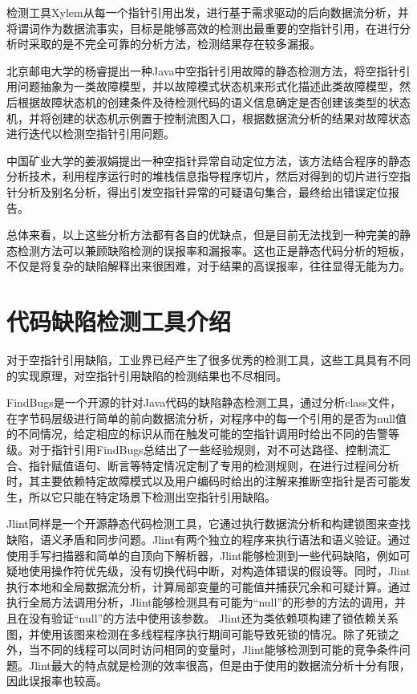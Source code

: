 检测工具Xylem\cite{nanda2009accurate}从每一个指针引用出发，进行基于需求驱动的后向数据流分析，并将谓词作为数据流事实，目标是能够高效的检测出最重要的空指针引用，在进行分析时采取的是不完全可靠的分析方法，检测结果存在较多漏报。

北京邮电大学的杨睿\cite{yangrui2012}提出一种Java中空指针引用故障的静态检测方法，将空指针引用问题抽象为一类故障模型，并以故障模式状态机来形式化描述此类故障模型，然后根据故障状态机的创建条件及待检测代码的语义信息确定是否创建该类型的状态机，并将创建的状态机示例置于控制流图入口，根据数据流分析的结果对故障状态进行迭代以检测空指针引用问题。

中国矿业大学的姜淑娟\cite{jiang2017}提出一种空指针异常自动定位方法，该方法结合程序的静态分析技术，利用程序运行时的堆栈信息指导程序切片，然后对得到的切片进行空指针分析及别名分析，得出引发空指针异常的可疑语句集合，最终给出错误定位报告。

总体来看，以上这些分析方法都有各自的优缺点，但是目前无法找到一种完美的静态检测方法可以兼顾缺陷检测的误报率和漏报率。这也正是静态代码分析的短板，不仅是将复杂的缺陷解释出来很困难，对于结果的高误报率，往往显得无能为力。

\section{代码缺陷检测工具介绍}
对于空指针引用缺陷，工业界已经产生了很多优秀的检测工具，这些工具具有不同的实现原理，对空指针引用缺陷的检测结果也不尽相同。

FindBugs是一个开源的针对Java代码的缺陷静态检测工具，通过分析class文件，在字节码层级进行简单的前向数据流分析，对程序中的每一个引用的是否为null值的不同情况，给定相应的标识从而在触发可能的空指针调用时给出不同的告警等级。对于指针引用FindBugs总结出了一些经验规则，对不可达路径、控制流汇合、指针赋值语句、断言等特定情况定制了专用的检测规则，在进行过程间分析时，其主要依赖特定故障模式以及用户编码时给出的注解来推断空指针是否可能发生，所以它只能在特定场景下检测出空指针引用缺陷。

Jlint同样是一个开源静态代码检测工具，它通过执行数据流分析和构建锁图来查找缺陷，语义矛盾和同步问题。Jlint有两个独立的程序来执行语法和语义验证。通过使用手写扫描器和简单的自顶向下解析器，Jlint能够检测到一些代码缺陷，例如可疑地使用操作符优先级，没有切换代码中断，对构造体错误的假设等。同时，Jlint执行本地和全局数据流分析，计算局部变量的可能值并捕获冗余和可疑计算。通过执行全局方法调用分析，Jlint能够检测具有可能为“null”的形参的方法的调用，并且在没有验证“null”的方法中使用该参数。 Jlint还为类依赖项构建了锁依赖关系图，并使用该图来检测在多线程程序执行期间可能导致死锁的情况。除了死锁之外，当不同的线程可以同时访问相同的变量时，Jlint能够检测到可能的竞争条件问题。Jlint最大的特点就是检测的效率很高，但是由于使用的数据流分析十分有限，因此误报率也较高。


